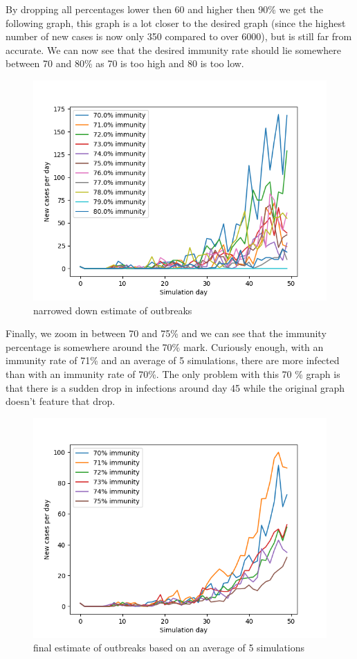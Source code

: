 \documentclass[runningheads]{llncs}
\begin{document}
\newpage
\noindent
By dropping all percentages lower then 60 and higher then 90\% we get the following graph, this graph is a lot closer to the desired graph (since the highest number of new cases is now only 350 compared to over 6000), but is still far from accurate. We can now see that the desired immunity rate should lie somewhere between 70 and 80\% as 70 is too high and 80 is too low.
\begin{figure}
	\includegraphics[width=\textwidth]{test_immunity_70-80.png}
	\caption{narrowed down estimate of outbreaks}
\end{figure}

\newpage
\noindent
Finally, we zoom in between 70 and 75\% and we can see that the immunity percentage is somewhere around the 70\% mark. Curiously enough, with an immunity rate of 71\% and an average of 5 simulations, there are more infected than with an immunity rate of 70\%. The only problem with this 70 \% graph is that there is a sudden drop in infections around day 45 while the original graph doesn't feature that drop.
\begin{figure}
	\includegraphics[width=\textwidth]{test_immunity_70-75.png}
	\caption{final estimate of outbreaks based on an average of 5 simulations}
\end{figure}
\newpage
\end{document}
